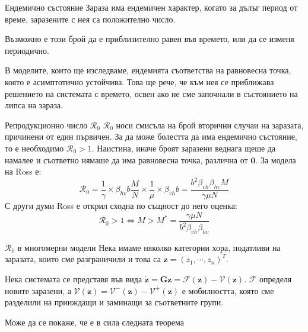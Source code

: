 \begin{frame}[t]{Ендемично състояние}
  Зараза има ендемичен характер, когато за дълъг период от време, заразените с нея са положително число.

  Възможно е този брой да е приблизително равен във времето, или да се изменя периодично.

  В моделите, които ще изследваме, ендемията съответства на равновесна точка, която е асимптотично устойчива. Това ще рече, че към нея се приближава решението на системата с времето, освен ако не сме започнали в състоянието на липса на зараза.
\end{frame}

\begin{frame}[t]{Репродукционно число $\mathscr{R}_0$}
  $\mathscr{R}_0$ носи смисъла на брой вторични случаи на заразата, причинени от един първичен. За да може болестта да има ендемично състояние, то е необходимо $\mathscr{R}_0 > 1$.
  Наистина, иначе броят заразени веднага щеше да намалее и съответно нямаше да има равновесна точка, различна от $\mathbf{0}$. За модела на Ross е:
  \begin{equation}
    \mathscr{R}_0 = \frac{1}{\gamma} \times \beta_{hv} b \frac{M}{N} \times \frac{1}{\mu} \times \beta_{vh} b = \frac{b^2 \beta_{vh} \beta_{hv} M}{\gamma \mu N}
  \end{equation}
  С други думи Ross е открил сходна по същност до него оценка:
  \begin{equation}
    \mathscr{R}_0 > 1 \iff M > M^* = \frac{\gamma \mu N}{b^2 \beta_{vh} \beta_{hv}}
  \end{equation}
\end{frame}

\begin{frame}[t]{$\mathscr{R}_0$ в многомерни модели}
  Нека имаме няколко категории хора, податливи на заразата, които сме разграничили и това са $\mathbf{z} = (z_1, \cdots, z_n)^T$.

  Нека системата се представя във вида $\dot{\mathbf{z}} = \mathbf{G}{\mathbf{z}} = \mathscr{F}(\mathbf{z}) - \mathscr{V}(\mathbf{z})$.
  $\mathscr{F}$ определя новите заразени, а $\mathscr{V}(\mathbf{z}) = \mathscr{V}^-(\mathbf{z}) - \mathscr{V}^+(\mathbf{z})$ е мобилността, която сме разделили на прииждащи и заминащи за съответните групи.

  Може да се покаже, че е в сила следната теорема
\end{frame}

